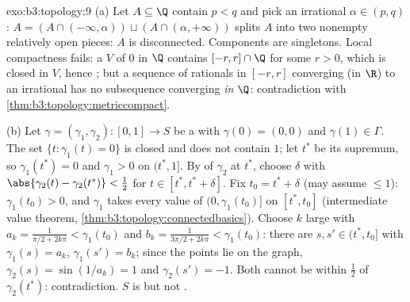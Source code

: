 \begin{solution}{exo:b3:topology:9}
(a) Let $A \subseteq \Q$ contain $p < q$ and pick an irrational
$\alpha \in (p, q)$: $A = (A \cap (-\infty, \alpha)) \sqcup
(A\cap(\alpha, +\infty))$ splits $A$ into two nonempty relatively
open pieces: $A$ is disconnected. Components are singletons.
Local compactness fails: a   $V$ of $0$ in
$\Q$ contains $[-r, r]\cap\Q$ for some $r > 0$, which is closed
in $V$, hence ; but a sequence of rationals in $[-r,r]$
converging (in $\R$) to an irrational has no subsequence
converging \emph{in $\Q$}: contradiction with
\cref{thm:b3:topology:metriccompact}.

(b) Let $\gamma = (\gamma_1, \gamma_2) \colon [0,1] \to S$ be a
 with $\gamma(0) = (0,0)$ and $\gamma(1) \in \Gamma$. The
set $\{t : \gamma_1(t) = 0\}$ is closed and does not contain
$1$; let $t^*$ be its supremum, so $\gamma_1(t^*) = 0$ and
$\gamma_1 > 0$ on $(t^*, 1]$. By  of $\gamma_2$ at
$t^*$, choose $\delta$ with $\abs{\gamma_2(t) -
\gamma_2(t^*)} < \tfrac12$ for $t \in [t^*, t^* + \delta]$. Fix
$t_0 = t^* + \delta$ (may assume $\leq 1$): $\gamma_1(t_0) > 0$,
and $\gamma_1$ takes every value of $(0, \gamma_1(t_0)]$ on
$[t^*, t_0]$ (intermediate value theorem,
\cref{thm:b3:topology:connectedbasics}). Choose $k$ large with
$a_k = \frac1{\pi/2 + 2k\pi} < \gamma_1(t_0)$ and $b_k =
\frac1{3\pi/2 + 2k\pi} < \gamma_1(t_0)$: there are $s, s' \in
(t^*, t_0]$ with $\gamma_1(s) = a_k$, $\gamma_1(s') = b_k$;
since the points lie on the graph, $\gamma_2(s) = \sin(1/a_k) =
1$ and $\gamma_2(s') = -1$. Both cannot be within $\frac12$ of
$\gamma_2(t^*)$: contradiction. $S$ is  but not
.
\end{solution}

